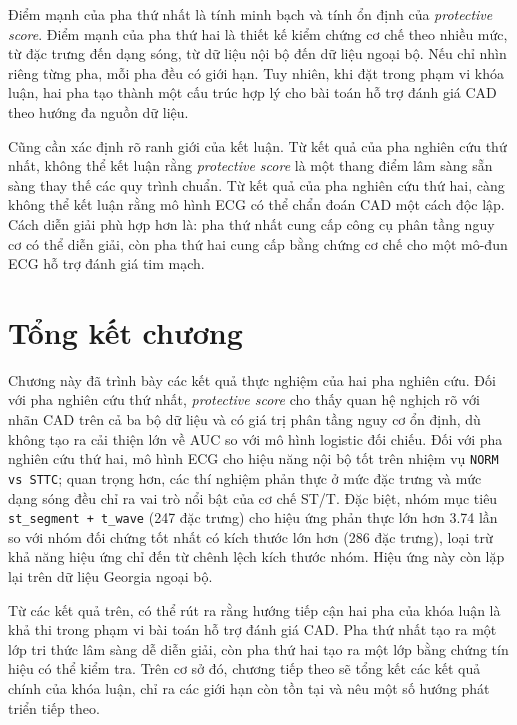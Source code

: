 \blocksep

Điểm mạnh của pha thứ nhất là tính minh bạch và tính ổn định của \textit{protective score}. Điểm mạnh của pha thứ hai là thiết kế kiểm chứng cơ chế theo nhiều mức, từ đặc trưng đến dạng sóng, từ dữ liệu nội bộ đến dữ liệu ngoại bộ. Nếu chỉ nhìn riêng từng pha, mỗi pha đều có giới hạn. Tuy nhiên, khi đặt trong phạm vi khóa luận, hai pha tạo thành một cấu trúc hợp lý cho bài toán hỗ trợ đánh giá CAD theo hướng đa nguồn dữ liệu.

\blocksep

Cũng cần xác định rõ ranh giới của kết luận. Từ kết quả của pha nghiên cứu thứ nhất, không thể kết luận rằng \textit{protective score} là một thang điểm lâm sàng sẵn sàng thay thế các quy trình chuẩn. Từ kết quả của pha nghiên cứu thứ hai, càng không thể kết luận rằng mô hình ECG có thể chẩn đoán CAD một cách độc lập. Cách diễn giải phù hợp hơn là: pha thứ nhất cung cấp công cụ phân tầng nguy cơ có thể diễn giải, còn pha thứ hai cung cấp bằng chứng cơ chế cho một mô-đun ECG hỗ trợ đánh giá tim mạch.

\section{Tổng kết chương}

\blocksep

Chương này đã trình bày các kết quả thực nghiệm của hai pha nghiên cứu. Đối với pha nghiên cứu thứ nhất, \textit{protective score} cho thấy quan hệ nghịch rõ với nhãn CAD trên cả ba bộ dữ liệu và có giá trị phân tầng nguy cơ ổn định, dù không tạo ra cải thiện lớn về AUC so với mô hình logistic đối chiếu. Đối với pha nghiên cứu thứ hai, mô hình ECG cho hiệu năng nội bộ tốt trên nhiệm vụ \texttt{NORM vs STTC}; quan trọng hơn, các thí nghiệm phản thực ở mức đặc trưng và mức dạng sóng đều chỉ ra vai trò nổi bật của cơ chế ST/T. Đặc biệt, nhóm mục tiêu \texttt{st\_segment + t\_wave} (247 đặc trưng) cho hiệu ứng phản thực lớn hơn 3.74 lần so với nhóm đối chứng tốt nhất có kích thước lớn hơn (286 đặc trưng), loại trừ khả năng hiệu ứng chỉ đến từ chênh lệch kích thước nhóm. Hiệu ứng này còn lặp lại trên dữ liệu Georgia ngoại bộ.

\blocksep

Từ các kết quả trên, có thể rút ra rằng hướng tiếp cận hai pha của khóa luận là khả thi trong phạm vi bài toán hỗ trợ đánh giá CAD. Pha thứ nhất tạo ra một lớp tri thức lâm sàng dễ diễn giải, còn pha thứ hai tạo ra một lớp bằng chứng tín hiệu có thể kiểm tra. Trên cơ sở đó, chương tiếp theo sẽ tổng kết các kết quả chính của khóa luận, chỉ ra các giới hạn còn tồn tại và nêu một số hướng phát triển tiếp theo.
